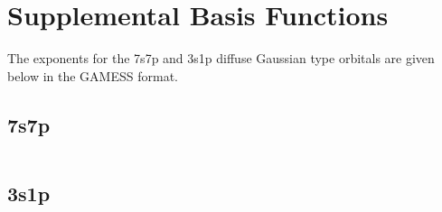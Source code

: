 \section{Supplemental Basis Functions}
%
%
The exponents for the 7s7p and 3s1p diffuse Gaussian type orbitals are given below in the GAMESS format.
\subsection{7s7p}
\inputminted{md}{parts/basis7s7p.txt}
\subsection{3s1p}
\inputminted{md}{parts/basis3s1p.txt}
\newpage
